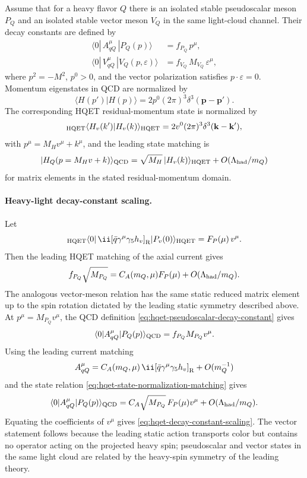 Assume that for a heavy flavor \(Q\) there is an isolated stable pseudoscalar
meson \(P_Q\) and an isolated stable vector meson \(V_Q\) in the same
light-cloud channel.  Their decay constants are defined by
\begin{align}
  \langle 0|\,A^\mu_{qQ}\,|P_Q(p)\rangle
  &=
  f_{P_Q}\,p^\mu,
  \label{eq:hqet-pseudoscalar-decay-constant}\\
  \langle 0|\,V^\mu_{qQ}\,|V_Q(p,\varepsilon)\rangle
  &=
  f_{V_Q}\,M_{V_Q}\,\varepsilon^\mu,
  \label{eq:hqet-vector-decay-constant}
\end{align}
where \(p^2=-M^2\), \(p^0>0\), and the vector polarization satisfies
\(p\cdot\varepsilon=0\).  Momentum eigenstates in QCD are normalized by
\[
  \langle H(p')|H(p)\rangle
  =
  2p^0(2\pi)^3\delta^3(\mathbf p-\mathbf p').
\]
The corresponding HQET residual-momentum state is normalized by
\[
  {}_{\rm HQET}\langle H_v(k')|H_v(k)\rangle_{\rm HQET}
  =
  2v^0(2\pi)^3\delta^3(\mathbf k-\mathbf k'),
\]
with \(p^\mu=M_Hv^\mu+k^\mu\), and the leading state matching is
\begin{equation}
  |H_Q(p=M_Hv+k)\rangle_{\rm QCD}
  =
  \sqrt{M_H}\,|H_v(k)\rangle_{\rm HQET}
  +O(\Lambda_{\rm had}/m_Q)
  \label{eq:hqet-state-normalization-matching}
\end{equation}
for matrix elements in the stated residual-momentum domain.

\paragraph{Heavy-light decay-constant scaling.}
Let
\[
  {}_{\rm HQET}\langle0|\,\ii[\bar q\gamma^\mu\gamma_5h_v]_{\rm R}
  |P_v(0)\rangle_{\rm HQET}
  =
  F_P(\mu)\,v^\mu .
\]
Then the leading HQET matching of the axial current gives
\begin{equation}
  f_{P_Q}\sqrt{M_{P_Q}}
  =
  C_A(m_Q,\mu)F_P(\mu)
  +O(\Lambda_{\rm had}/m_Q).
  \label{eq:hqet-decay-constant-scaling}
\end{equation}
The analogous vector-meson relation has the same static reduced matrix
element up to the spin rotation dictated by the leading static symmetry
described above.
At \(p^\mu=M_{P_Q}v^\mu\), the QCD definition
\eqref{eq:hqet-pseudoscalar-decay-constant} gives
\[
  \langle0|A^\mu_{qQ}|P_Q(p)\rangle_{\rm QCD}
  =
  f_{P_Q}M_{P_Q}v^\mu .
\]
Using the leading current matching
\[
  A^\mu_{qQ}
  =
  C_A(m_Q,\mu)\,\ii[\bar q\gamma^\mu\gamma_5h_v]_{\rm R}
  +O(m_Q^{-1})
\]
and the state relation \eqref{eq:hqet-state-normalization-matching} gives
\[
  \langle0|A^\mu_{qQ}|P_Q(p)\rangle_{\rm QCD}
  =
  C_A\sqrt{M_{P_Q}}\,
  F_P(\mu)v^\mu
  +O(\Lambda_{\rm had}/m_Q).
\]
Equating the coefficients of \(v^\mu\) gives
\eqref{eq:hqet-decay-constant-scaling}.  The vector statement follows because
the leading static action transports color but contains no operator acting on
the projected heavy spin; pseudoscalar and vector states in the same light
cloud are related by the heavy-spin symmetry of the leading theory.

